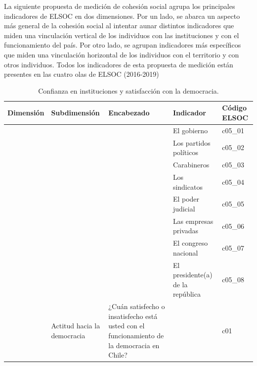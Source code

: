 \documentclass[
  12pt,
]{book}
\begin{document}
La siguiente propuesta de medición de cohesión social agrupa los principales indicadores de ELSOC en dos dimensiones. Por un lado, se abarca un aspecto más general de la cohesión social al intentar aunar distintos indicadores que miden una vinculación vertical de los individuos con las instituciones y con el funcionamiento del país. Por otro lado, se agrupan indicadores más específicos que miden una vinculación horizontal de los individuos con el territorio y con otros individuos. Todos los indicadores de esta propuesta de medición están presentes en las cuatro olas de ELSOC (2016-2019)

\begin{table}[!h]

\caption{\label{tab:unnamed-chunk-5}Confianza en instituciones y satisfacción con la democracia.}
\centering
\fontsize{10}{12}\selectfont
\begin{tabu} to 
\toprule
Dimensión & Subdimensión & Encabezado & Indicador & Código ELSOC\\
\midrule
 &  &  & El gobierno & c05\_01\\
 &  &  & Los partidos políticos & c05\_02\\
 &  &  & Carabineros & c05\_03\\
 &  &  & Los sindicatos & c05\_04\\
 &  &  & El poder judicial & c05\_05\\
 &  &  & Las empresas privadas & c05\_06\\
 &  &  & El congreso nacional & c05\_07\\
 &  &  & El presidente(a) de la república & c05\_08\\
 & Actitud hacia la democracia & ¿Cuán satisfecho o insatisfecho está usted con el funcionamiento de la democracia en Chile? &  & c01\\
\bottomrule
\end{tabu}
\end{table}
\end{document}
